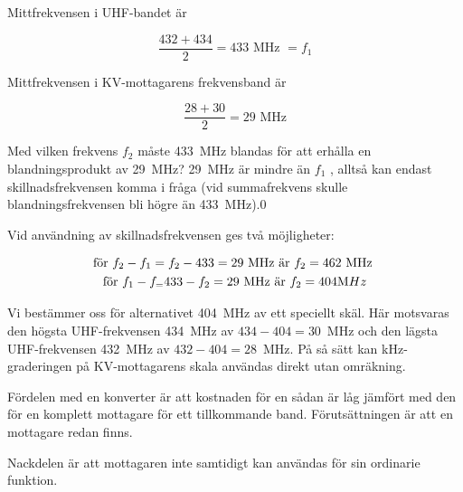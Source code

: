 Mittfrekvensen i UHF-bandet är

\[\frac{432+434}{2} = 433\text{ MHz } = f_1\]

Mittfrekvensen i KV-mottagarens frekvensband är

\[\frac{28 + 30}{2} = 29\text{ MHz}\]

Med vilken frekvens \(f_2\) måste 433~MHz blandas för att erhålla en
blandningsprodukt av 29~MHz?
29~MHz är mindre än \(f_1\) , alltså kan endast skillnadsfrekvensen komma i
fråga (vid summafrekvens skulle blandningsfrekvensen bli högre än 433~MHz).0

Vid användning av skillnadsfrekvensen ges två möjligheter:

\begin{gather*}
  \text{för }f_2 - f_1 = f_2 - 433 = 29\text{ MHz är }f_2 = 462\text{ MHz} \\
  \text{för }f_1 - f_ = 433 - f_2 = 29\text{ MHz är }f_2 = 404{\text MHz} \\
\end{gather*}

Vi bestämmer oss för alternativet 404~MHz av ett speciellt skäl.
Här motsvaras den högsta UHF-frekvensen 434~MHz av \(434 - 404 = 30\)~MHz
och den lägsta UHF-frekvensen 432~MHz av \(432 - 404 = 28\)~MHz.
På så sätt kan kHz-graderingen på KV-mottagarens skala användas direkt utan
omräkning.

Fördelen med en konverter är att kostnaden för en sådan är låg jämfört
med den för en komplett mottagare för ett tillkommande band.
Förutsättningen är att en mottagare redan finns.

Nackdelen är att mottagaren inte samtidigt kan användas för sin
ordinarie funktion.
